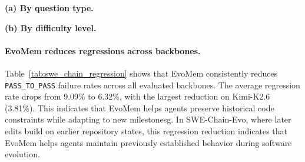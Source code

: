 \documentclass{article}
\begin{document}
\begin{table}[htbp]
\centering
\caption{
\textbf{\small \textsc{PersonaMem-Evo} accuracy breakdown (\%).}
Results are grouped by reasoning type and difficulty level.
}
\label{tab:personamem_breakdown}

\begin{minipage}[t]{0.53\linewidth}
\centering
{}
\textbf{(a) By question type.}
\end{minipage}
\hspace{0.035\linewidth}
\begin{minipage}[t]{0.41\linewidth}
\centering
{}
\textbf{(b) By difficulty level.}
\end{minipage}

\end{table}


\paragraph{EvoMem reduces regressions across backbones.}
Table~\ref{tab:swe_chain_regression} shows that EvoMem consistently reduces \texttt{PASS\_TO\_PASS} failure rates across all evaluated backbones. The average regression rate drops from 9.09\% to 6.32\%, with the largest reduction on Kimi-K2.6 (3.81\%). This indicates that EvoMem helps agents preserve historical code constraints while adapting to new milestonesg. In SWE-Chain-Evo, where later edits build on earlier repository states, this regression reduction indicates that EvoMem helps agents maintain previously established behavior during software evolution.
\end{document}
